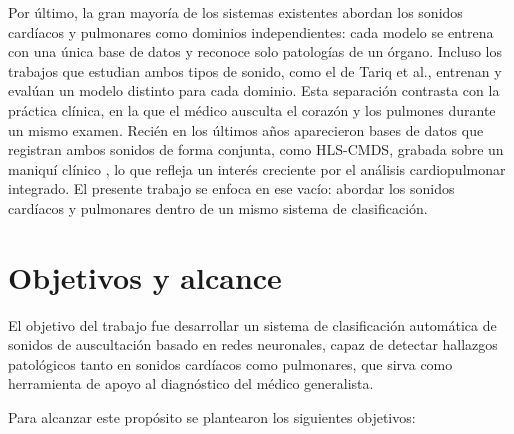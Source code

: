Por último, la gran mayoría de los sistemas existentes abordan los sonidos cardíacos y pulmonares
como dominios independientes: cada modelo se entrena con una única base de datos y reconoce solo
patologías de un órgano. Incluso los trabajos que estudian ambos tipos de sonido, como el de Tariq
et al., entrenan y evalúan un modelo distinto para cada dominio. Esta separación contrasta con la
práctica clínica, en la que el médico ausculta el corazón y los pulmones durante un mismo examen.
Recién en los últimos años aparecieron bases de datos que registran ambos sonidos de forma conjunta,
como HLS-CMDS, grabada sobre un maniquí clínico \citep{torabi2025hlscmds}, lo que refleja un interés
creciente por el análisis cardiopulmonar integrado. El presente trabajo se enfoca en ese vacío:
abordar los sonidos cardíacos y pulmonares dentro de un mismo sistema de clasificación.


\section{Objetivos y alcance}
\label{sec:objetivos}

El objetivo del trabajo fue desarrollar un sistema de clasificación automática de sonidos de
auscultación basado en redes neuronales, capaz de detectar hallazgos patológicos tanto en sonidos
cardíacos como pulmonares, que sirva como herramienta de apoyo al diagnóstico del médico
generalista.

Para alcanzar este propósito se plantearon los siguientes objetivos:

